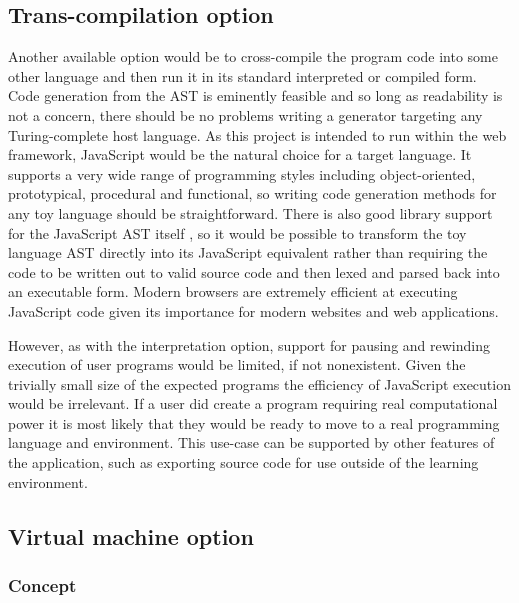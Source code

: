 \subsection{Trans-compilation option}

Another available option would be to cross-compile the program code into some other language and then run it in its standard interpreted or compiled form. Code generation from the AST is eminently feasible and so long as readability is not a concern, there should be no problems writing a generator targeting any Turing-complete host language. As this project is intended to run within the web framework, JavaScript would be the natural choice for a target language. It supports a very wide range of programming styles including object-oriented, prototypical, procedural and functional, so writing code generation methods for any toy language should be straightforward. There is also good library support for the JavaScript AST itself \cite{estree}, so it would be possible to transform the toy language AST directly into its JavaScript equivalent rather than requiring the code to be written out to valid source code and then lexed and parsed back into an executable form. Modern browsers are extremely efficient at executing JavaScript code given its importance for modern websites and web applications.

However, as with the interpretation option, support for pausing and rewinding execution of user programs would be limited, if not nonexistent. Given the trivially small size of the expected programs the efficiency of JavaScript execution would be irrelevant. If a user did create a program requiring real computational power it is most likely that they would be ready to move to a real programming language and environment. This use-case can be supported by other features of the application, such as exporting source code for use outside of the learning environment.

\subsection{Virtual machine option}

\subsubsection{Concept}

